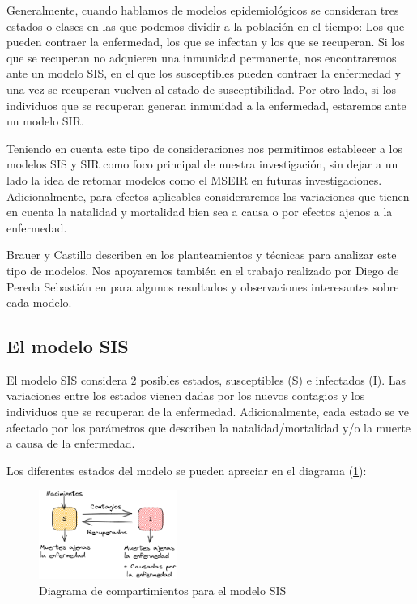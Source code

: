 Generalmente, cuando hablamos de modelos epidemiológicos se consideran tres estados o clases en las que podemos dividir a la población en el tiempo: Los que pueden contraer la enfermedad, los que se infectan y los que se recuperan. Si los que se recuperan no adquieren una inmunidad permanente, nos encontraremos ante un modelo SIS, en el que los susceptibles pueden contraer la enfermedad y una vez se recuperan vuelven al estado de susceptibilidad. Por otro lado, si los individuos que se recuperan generan inmunidad a la enfermedad, estaremos ante un modelo SIR. 

Teniendo en cuenta este tipo de consideraciones nos permitimos establecer a los modelos SIS y SIR como foco principal de nuestra investigación, sin dejar a un lado la idea de retomar modelos como el MSEIR en futuras investigaciones. Adicionalmente, para efectos aplicables consideraremos las variaciones que tienen en cuenta la natalidad y mortalidad bien sea a causa o por efectos ajenos a la enfermedad.

Brauer y Castillo describen en \cite{mateModelsInPopulationAndEpidemiology} los planteamientos y técnicas para analizar este tipo de modelos. Nos apoyaremos también en el trabajo realizado por Diego de Pereda Sebastián en \cite{diego2010} para algunos resultados y observaciones interesantes sobre cada modelo.

\subsection{El modelo SIS}\label{sub:modeloSIS}

El modelo SIS considera 2 posibles estados, susceptibles (S) e infectados (I). Las variaciones entre los estados vienen dadas por los nuevos contagios y los individuos que se recuperan de la enfermedad. Adicionalmente, cada estado se ve afectado por los parámetros que describen la natalidad/mortalidad y/o la muerte a causa de la enfermedad. 

Los diferentes estados del modelo se pueden apreciar en el diagrama (\ref{fig:SIS}):

\begin{figure}[h]
  \centering
    \includegraphics[width=0.4\textwidth]{Imagenes/SIS_compartimientos.PNG}
  \caption{Diagrama de compartimientos para el modelo SIS}
  \label{fig:SIS}
\end{figure}

